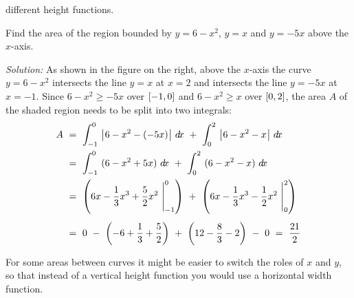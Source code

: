 different height functions.
\begin{exmp}\label{exmp:areacurves4}
\noindent Find the area of the region bounded by $y=6-x^2$, $y=x$ and $y=-5x$
above the $x$-axis.
\par\noindent\emph{Solution:} As shown in the figure on the right, above the
$x$-axis the curve $y=6-x^2$ intersects the line $y=x$ at $x=2$ and intersects
the line $y=-5x$ at $x=-1$. Since $6-x^2 \ge -5x$ over $\lbrack -1,0 \rbrack$ and
$6-x^2 \ge x$ over $\lbrack 0,2 \rbrack$, the area $A$ of the shaded region needs to be
split into two integrals:
\begin{align*}
A ~&=~ \int_{-1}^0~\bigl\lvert\mspace{1mu}6 - x^2 - (-5x)\mspace{1mu}\bigr\rvert~d\!x ~+~ \int_{0}^2~\bigl\lvert\mspace{1mu}6 - x^2 - x\mspace{1mu}\bigr\rvert~d\!x\\
&=~ \int_{-1}^0~(6 - x^2 + 5x)~d\!x ~+~ \int_{0}^2~(6 - x^2 - x)~d\!x\\
&=~ \left(6x -\frac{1}{3}x^3 + \frac{5}{2}x^2~\Biggr|_{-1}^{0}\right) ~+~ 
    \left(6x -\frac{1}{3}x^3 - \frac{1}{2}x^2~\Biggr|_{0}^{2}\right)\\[4pt]
&=~ 0 ~-~ \left(-6 + \frac{1}{3} + \frac{5}{2}\right)  ~+~
    \left(12 - \frac{8}{3} - 2\right) ~-~ 0
~=~ \frac{21}{2}
\end{align*}
\end{exmp}
\divider

\noindent For some areas between curves it might be easier to switch the roles
of $x$ and $y$, so that instead of a vertical height function you would
use a horizontal width function.

